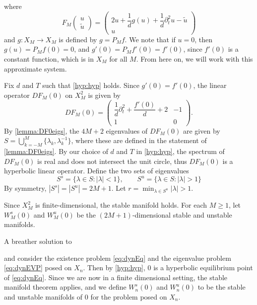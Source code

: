 \documentclass[12pt,reqno]{amsart}
\begin{document}
where
\begin{equation}\label{eq:FM}
F_M\begin{pmatrix}u \\ \tilde{u} \end{pmatrix} = 
\begin{pmatrix}2u  + \dfrac{1}{d}g(u) + \dfrac{1}{d} \partial_t^2 u - \tilde{u} \\
u
\end{pmatrix}
\end{equation}
and $g: X_M \rightarrow X_M$ is defined by $g = P_M f$. We note that if $u = 0$, then $g(u) = P_M f(0) = 0$, and $g'(0) = P_M f'(0) = f'(0)$, since $f'(0)$ is a constant function, which is in $X_M$ for all $M$. From here on, we will work with this approximate system. 

Fix $d$ and $T$ such that \cref{hyp:hyp} holds. Since $g'(0) = f'(0)$, the linear operator $DF_M(0)$ on $X_M^2$ is given by
\begin{equation}\label{eq:DFM0}
DF_M(0) = \begin{pmatrix}
\dfrac{1}{d}\partial_t^2 + \dfrac{f'(0)}{d} + 2 & -1 \\ 1 & 0
\end{pmatrix}.
\end{equation}
By \cref{lemma:DF0eigs}, the $4M+2$ eigenvalues of $DF_M(0)$ are given by $S = \bigcup_{k=-M}^M \{\lambda_k, \lambda_k^{-1} \}$, where these are defined in the statement of \cref{lemma:DF0eigs}. By our choice of $d$ and $T$ in \cref{hyp:hyp}, the spectrum of $DF_M(0)$ is real and does not intersect the unit circle, thus $DF_M(0)$ is a hyperbolic linear operator. Define the two sets of eigenvalues
\[
S^s = \{ \lambda \in S : |\lambda| < 1\}, \qquad S^u = \{ \lambda \in S : |\lambda| > 1\}
\]
By symmetry, $|S^s| = |S^u| = 2M+1$. Let $r = \min_{\lambda \in S^u} |\lambda| > 1$.

Since $X_M^2$ is finite-dimensional, the stable manifold holds. For each $M \geq 1$, let $W_M^s(0)$ and $W_M^u(0)$ be the $(2M+1)$-dimensional stable and unstable manifolds. 


A breather solution to 


and consider the existence problem \cref{eq:dynEq} and the eigenvalue problem \cref{eq:dynEVP} posed on $X_n$. Then by \cref{hyp:hyp}, 0 is a hyperbolic equilibrium point of \cref{eq:dynEq}. Since we are now in a finite dimensional setting, the stable manifold theorem applies, and we define $W_n^s(0)$ and $W_n^u(0)$ to be the stable and unstable manifolds of 0 for the problem posed on $X_n$. 
\end{document}
